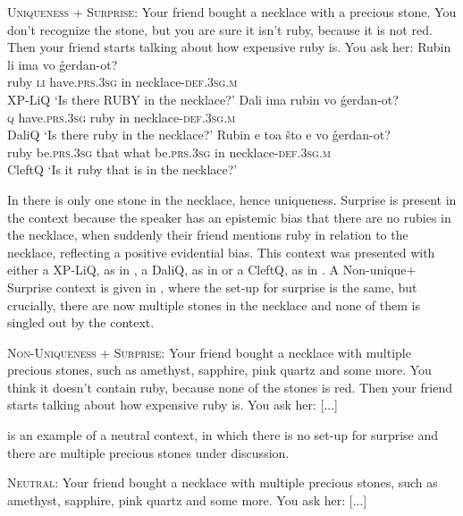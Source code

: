 \documentclass[output=paper,
colorlinks,
citecolor=brown,
newtxmath
]{langscibook}
\begin{document}
\eanoraggedright
\eanoraggedright \textsc{Uniqueness + Surprise:} Your friend bought a necklace with a precious stone. You don’t recognize the stone, but you are sure it isn't ruby, because it is not red. Then your friend starts talking about how expensive ruby is. You ask her: \label{unisur}
    \ex \gll Rubin li ima vo ǵerdan-ot? \\
ruby \textsc{li} have.\textsc{prs.3sg} in necklace-\textsc{def.3sg.m} \\ \hfill XP-LiQ
\glt `Is there RUBY in the necklace?'  \label{rubinli}
    \ex \gll Dali ima rubin vo ǵerdan-ot? \\
\textsc{q} have.\textsc{prs.3sg} ruby in necklace-\textsc{def.3sg.m} \\ \hfill DaliQ
\glt `Is there ruby in the necklace?'  \label{dalirubin}
    \ex \gll Rubin e toa što e vo ǵerdan-ot? \\
ruby be.\textsc{prs.3sg} that what be.\textsc{prs.3sg} in necklace-\textsc{def.3sg.m} \\ \hfill CleftQ
\glt `Is it ruby that is in the necklace?'  \label{cleftrubin}
\z\z

\noindent
In  there is only one stone in the necklace, hence uniqueness. Surprise is present in the context because the speaker has an epistemic bias that there are no rubies in the necklace, when suddenly their friend mentions ruby in relation to the necklace, reflecting a positive evidential bias.
This context was presented with either a XP-LiQ, as in , a DaliQ, as in  or a CleftQ, as in . A Non-unique$+$Surprise context is given in , where the set-up for surprise is the same, but crucially, there are now multiple stones in the necklace and none of them is singled out by the context.


\eanoraggedright \textsc{Non-Uniqueness + Surprise:} Your friend bought a necklace with multiple precious stones, such as amethyst, sapphire, pink quartz and some more. You think it doesn't contain ruby, because none of the stones is red. Then your friend starts talking about how expensive ruby is. You ask her: [...] \label{nonunisur}
\z

\noindent
{} is an example of a neutral context, in which there is no set-up for surprise and there are multiple precious stones under discussion.


\eanoraggedright
\textsc{Neutral:} Your friend bought a necklace with multiple precious stones, such as amethyst, sapphire, pink quartz and some more. You ask her: [...] \label{neut}
\z
\end{document}
